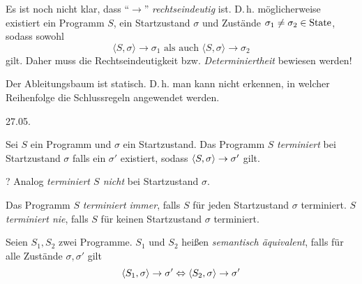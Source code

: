 \par\bigskip
\begin{remark}
    Es ist noch nicht klar, dass ``$\to$'' \emph{rechtseindeutig} ist. D.\,h. möglicherweise existiert ein Programm $S$, ein Startzustand $\sigma$ und Zustände $\sigma_1 \neq \sigma_2 \in \operatorname{State}$, sodass sowohl
    \[
    \langle S, \sigma \rangle \to \sigma_1 \text{ als auch } \langle S, \sigma \rangle \to \sigma_2
    \]
    gilt. Daher muss die Rechtseindeutigkeit bzw. \emph{Determiniertheit} bewiesen werden!
\end{remark}

\par\medskip
\begin{remark}[Ableitungsbaum]
    Der Ableitungsbaum ist statisch. D.\,h. man kann nicht erkennen, in welcher Reihenfolge die Schlussregeln angewendet werden.
\end{remark}



\newpage
\hfill 27.05.
\begin{definition}
    Sei $S$ ein Programm und $\sigma$ ein Startzustand. Das Programm $S$ \emph{terminiert} bei Startzustand $\sigma$ falls ein $\sigma'$ existiert, sodass $\langle S, \sigma \rangle \to \sigma'$ gilt.

    ? Analog \emph{terminiert $S$ nicht} bei Startzustand $\sigma$.

    Das Programm $S$ \emph{terminiert immer}, falls $S$ für jeden Startzustand $\sigma$ terminiert. $S$ \emph{terminiert nie}, falls $S$ für keinen Startzustand $\sigma$ terminiert.
\end{definition}

\begin{definition}
    Seien $S_1, S_2$ zwei Programme. $S_1$ und $S_2$ heißen \emph{semantisch äquivalent}, falls für alle Zustände $\sigma, \sigma'$ gilt
    \[
    \langle S_1, \sigma \rangle \to \sigma' \Leftrightarrow \langle S_2, \sigma \rangle \to \sigma'
    \]
\end{definition}


